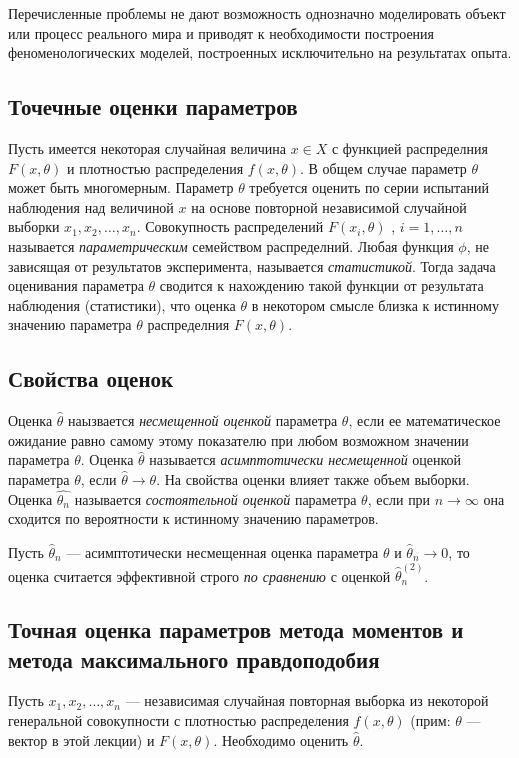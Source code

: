 \documentclass[12pt]{article}
\begin{document}
Перечисленные проблемы не дают возможность однозначно моделировать объект или процесс реального мира и приводят к необходимости построения феноменологических моделей, построенных исключительно на результатах опыта.

\subsection{Точечные оценки параметров}
Пусть имеется некоторая случайная величина $x \in X$ с функцией распределния $F(x, \theta)$ и плотностью распределения $f(x, \theta)$. В общем случае параметр $\theta$ может быть многомерным. Параметр $\theta$ требуется оценить по серии испытаний наблюдения над величиной $x$ на основе повторной независимой случайной выборки $x_1, x_2, \ldots, x_n$. Совокупность распределений $F(x_i, \theta)$ , $i = 1, \ldots, n$ называется \emph{параметрическим} семейством распределний. Любая функция $\phi$, не зависящая от результатов эксперимента, называется \emph{статистикой}. Тогда задача оценивания параметра $\theta$ сводится к нахождению такой функции от результата наблюдения (статистики), что оценка $\theta$ в некотором смысле близка к истинному значению параметра $\theta$ распределния $F(x, \theta)$.

\subsection{Свойства оценок}
Оценка $\hat{\theta}$ наызвается \emph{несмещенной оценкой} параметра $\theta$, если ее математическое ожидание равно самому этому показателю при любом возможном значении параметра $\theta$. Оценка $\hat{\theta}$ называется \emph{асимптотически несмещенной} оценкой параметра $\theta$, если $\hat{\theta} \to \theta$. На свойства оценки влияет также объем выборки. Оценка $\hat{\theta_n}$ называется \emph{состоятельной оценкой} параметра $\theta$, если при $n \to \infty$ она сходится по вероятности к истинному значению параметров.

Пусть $\hat{\theta}_n$ --- асимптотически несмещенная оценка параметра $\theta$ и $\hat{\theta}_n \to 0$, то оценка считается эффективной строго \emph{по сравнению} с оценкой $\hat{\theta}_n^{(2)}$.


\begin{comment}
\theta
\hat{\theta}
\end{comment}

\subsection{Точная оценка параметров метода моментов и метода максимального правдоподобия}
Пусть $x_1, x_2, \ldots, x_n$ --- независимая случайная повторная выборка из некоторой генеральной совокупности с плотностью распределения $f(x, \theta)$ (прим: $\theta$ --- вектор в этой лекции) и $F(x, \theta)$. Необходимо оценить $\hat{\theta}$.
\end{document}
